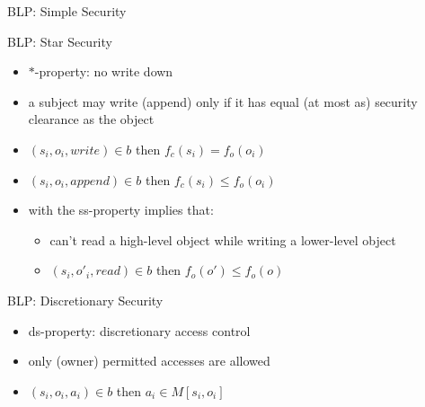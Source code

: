 \documentclass{beamer}
\begin{document}
\begin{frame}{BLP: Simple Security}
\begin{center}
{  }
  \end{center}
\end{frame}

\begin{frame}{BLP: Star Security}
  \begin{itemize}
  \item $*$-property: no write down
  \item a subject may write (append) only if it has equal (at most as)  security
    clearance as the object
  \item $(s_i, o_i, write) \in b$ then
    $f_c(s_i) = f_o(o_i)$
  \item $(s_i, o_i, append) \in b$ then
    $f_c(s_i) \leq f_o(o_i)$
  \item with the ss-property implies that:
    \begin{itemize}
      \item can't read a high-level object while writing a lower-level
        object
      \item $(s_i, o'_i, read) \in b$ then
        $f_o(o') \leq f_o(o)$
    \end{itemize}
  \end{itemize}
\end{frame}

\begin{frame}{BLP: Discretionary Security}
  \begin{itemize}
  \item ds-property: discretionary access control
  \item only (owner) permitted accesses are allowed
  \item $(s_i, o_i, a_i) \in b$ then
    $a_i \in M[s_i, o_i]$
  \end{itemize}
\end{frame}
\end{document}
